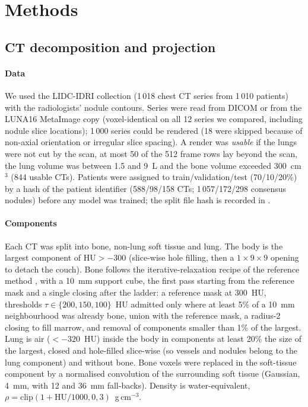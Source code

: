 \section{Methods}
\label{sec:methods}

\subsection{CT decomposition and projection}
\paragraph{Data} We used the LIDC-IDRI collection (1\,018 chest CT series from 1\,010 patients) with the radiologists' nodule contours.
Series were read from DICOM or from the LUNA16 MetaImage copy (voxel-identical on all 12 series we compared, including nodule slice locations); 1\,000 series
could be rendered (18 were skipped because of non-axial orientation or irregular slice spacing). A render was \emph{usable} if the lungs were not cut by the
scan, at most 50 of the 512 frame rows lay beyond the scan, the lung volume was between 1.5 and 9~L and the bone volume exceeded 300~cm$^3$
(844 usable CTs). Patients were assigned to train/validation/test (70/10/20\%) by a hash of the patient identifier (588/98/158 CTs; 1\,057/172/298
consensus nodules) before any model was trained; the split file hash is recorded in .

\paragraph{Components} Each CT was split into bone, non-lung soft tissue and lung. The body is the largest component of $\mathrm{HU}>-300$
(slice-wise hole filling, then a $1{\times}9{\times}9$ opening to detach the couch). Bone follows the iterative-relaxation recipe of the reference method \citep[Algorithm~1]{angaitkar2026anatomy}, with a 10~mm support cube,
the first pass starting from the reference mask and a single closing after the ladder:
a reference mask at 300~HU, thresholds $\tau\in\{200,150,100\}$~HU admitted only where at least 5\% of a 10~mm neighbourhood was already bone, union with the
reference mask, a radius-2 closing to fill marrow, and removal of components smaller than 1\% of the largest. Lung is air ($<-320$~HU) inside the body in
components at least 20\% the size of the largest, closed and hole-filled slice-wise (so vessels and nodules belong to the lung component) and
without bone. Bone voxels were replaced in the soft-tissue component by a normalised convolution of the surrounding soft tissue (Gaussian, 4~mm, with
12 and 36~mm fall-backs). Density is water-equivalent, $\rho=\mathrm{clip}(1+\mathrm{HU}/1000,0,3)$~g\,cm$^{-3}$.


